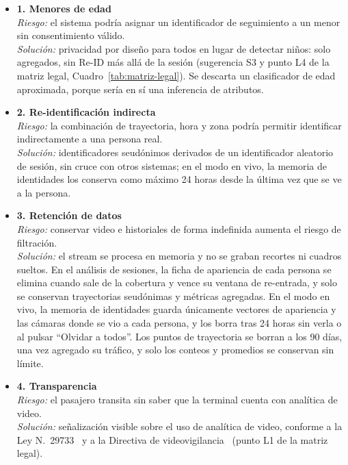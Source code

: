 \documentclass[12pt,a4paper]{article}
\begin{document}
\begin{itemize}
    \item \textbf{1. Menores de edad} \\
    \textit{Riesgo:} el sistema podría asignar un identificador de
    seguimiento a un menor sin consentimiento válido. \\
    \textit{Solución:} privacidad por diseño para todos en lugar de detectar
    niños: solo agregados, sin Re-ID más allá de la sesión (sugerencia S3 y
    punto L4 de la matriz legal, Cuadro~\ref{tab:matriz-legal}). Se descarta
    un clasificador de edad aproximada, porque sería en sí una inferencia de
    atributos.

    \item \textbf{2. Re-identificación indirecta} \\
    \textit{Riesgo:} la combinación de trayectoria, hora y zona podría
    permitir identificar indirectamente a una persona real. \\
    \textit{Solución:} identificadores seudónimos derivados de un
    identificador aleatorio de sesión, sin cruce con otros sistemas; en el
    modo en vivo, la memoria de identidades los conserva como máximo 24 horas
    desde la última vez que se ve a la persona.

    \item \textbf{3. Retención de datos} \\
    \textit{Riesgo:} conservar video e historiales de forma indefinida
    aumenta el riesgo de filtración. \\
    \textit{Solución:} el stream se procesa en memoria y no se graban
    recortes ni cuadros sueltos. En el análisis de sesiones, la ficha de
    apariencia de cada persona se elimina cuando sale de la cobertura y
    vence su ventana de re-entrada, y solo se conservan trayectorias
    seudónimas y métricas agregadas. En el modo en vivo, la memoria de
    identidades guarda únicamente vectores de apariencia y las cámaras
    donde se vio a cada persona, y los borra tras 24 horas
    sin verla o al pulsar ``Olvidar a todos''. Los puntos de trayectoria
    se borran a los 90 días, una vez agregado su tráfico, y solo los
    conteos y promedios se conservan sin límite.

    \item \textbf{4. Transparencia} \\
    \textit{Riesgo:} el pasajero transita sin saber que la terminal
    cuenta con analítica de video. \\
    \textit{Solución:} señalización visible sobre el uso de analítica de
    video, conforme a la Ley N.\textdegree~29733~\cite{ley29733} y a la Directiva
    de videovigilancia~\cite{directiva-videovigilancia} (punto L1 de la matriz legal).


\end{itemize}
\end{document}
